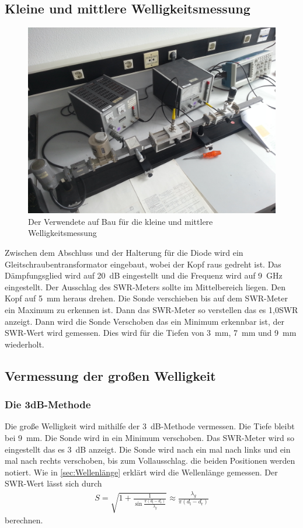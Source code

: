 \subsection{Kleine und mittlere Welligkeitsmessung}
\begin{figure}[h!]
	\centering
	\includegraphics[scale =0.1]{../Grafiken/Aufbau_5.jpg}
	\caption{Der Verwendete auf Bau für die kleine und mittlere Welligkeitsmessung\label{fig:AufbauWellig}}
\end{figure}
Zwischen dem Abschluss und der Halterung für die Diode wird ein Gleitschraubentransformator eingebaut, wobei der Kopf raus gedreht ist. Das Dämpfungsglied wird auf \SI{20}{\deci\bel} eingestellt und die Frequenz wird auf \SI{9}{\giga\hertz} eingestellt. Der Ausschlag des SWR-Meters sollte im Mittelbereich liegen. Den Kopf auf \SI{5}{\milli\meter} heraus drehen. Die Sonde verschieben bis auf dem SWR-Meter ein Maximum zu erkennen ist. Dann das SWR-Meter so verstellen das es 1,0SWR anzeigt. Dann wird die Sonde Verschoben das ein Minimum erkennbar ist, der SWR-Wert wird gemessen. Dies wird für die Tiefen von \SI{3}{\milli\meter}, \SI{7}{\milli\meter} und \SI{9}{\milli\meter} wiederholt.
\subsection{Vermessung der großen Welligkeit}
\subsubsection{Die 3dB-Methode}
Die große Welligkeit wird mithilfe der \SI{3}{\deci\bel}-Methode vermessen. Die Tiefe bleibt bei \SI{9}{\milli\meter}. Die Sonde wird in ein Minimum verschoben. Das SWR-Meter wird so eingestellt das es \SI{3}{\deci\bel} anzeigt. Die Sonde wird nach ein mal nach links und ein mal nach rechts verschoben, bis zum Vollausschlag. die beiden Positionen werden notiert. Wie in \cref{sec:Wellenlänge} erklärt wird die Wellenlänge gemessen. Der SWR-Wert lässt sich durch 
\begin{align}
	S=\sqrt{1+\frac{1}{\sin\frac{\pi ( d_\text{l} - d_\text{r} ) }{ \lambda_g }}} \approx \frac{ \lambda_g }{\pi(d_\text{l} - d_\text{r})}
	\label{eq:SWR_3dB}
\end{align}
berechnen.
